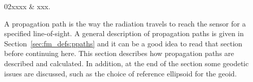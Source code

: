 %
%
 \label{sec:ppath}

%
%
\starthistory
  02xxxx & xxx.\\
\stophistory


%
%
%


A propagation path is the way the radiation travels to reach the
sensor for a specified line-of-sight. A general description of
propagation paths is given in Section~\ref{sec:fm_defs:ppaths} and it
can be a good idea to read that section before continuing here. This
section describes how propagation paths are described and calculated.
In addition, at the end of the section some geodetic issues are
discussed, such as the choice of reference ellipsoid for the geoid.


